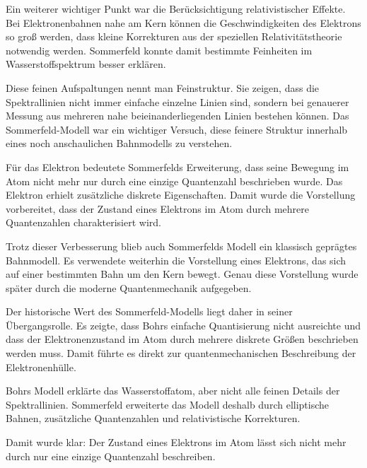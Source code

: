 Ein weiterer wichtiger Punkt war die Berücksichtigung relativistischer Effekte.
Bei Elektronenbahnen nahe am Kern können die Geschwindigkeiten des Elektrons so
groß werden, dass kleine Korrekturen aus der speziellen Relativitätstheorie
notwendig werden. Sommerfeld konnte damit bestimmte Feinheiten im
Wasserstoffspektrum besser erklären.

Diese feinen Aufspaltungen nennt man Feinstruktur. Sie zeigen, dass die
Spektrallinien nicht immer einfache einzelne Linien sind, sondern bei genauerer
Messung aus mehreren nahe beieinanderliegenden Linien bestehen können. Das
Sommerfeld-Modell war ein wichtiger Versuch, diese feinere Struktur innerhalb
eines noch anschaulichen Bahnmodells zu verstehen.

Für das Elektron bedeutete Sommerfelds Erweiterung, dass seine Bewegung im Atom
nicht mehr nur durch eine einzige Quantenzahl beschrieben wurde. Das Elektron
erhielt zusätzliche diskrete Eigenschaften. Damit wurde die Vorstellung
vorbereitet, dass der Zustand eines Elektrons im Atom durch mehrere Quantenzahlen
charakterisiert wird.

Trotz dieser Verbesserung blieb auch Sommerfelds Modell ein klassisch
geprägtes Bahnmodell. Es verwendete weiterhin die Vorstellung eines Elektrons,
das sich auf einer bestimmten Bahn um den Kern bewegt. Genau diese Vorstellung
wurde später durch die moderne Quantenmechanik aufgegeben.

Der historische Wert des Sommerfeld-Modells liegt daher in seiner
Übergangsrolle. Es zeigte, dass Bohrs einfache Quantisierung nicht ausreichte
und dass der Elektronenzustand im Atom durch mehrere diskrete Größen beschrieben
werden muss. Damit führte es direkt zur quantenmechanischen Beschreibung der
Elektronenhülle.

\begin{DidacticBox}
	
	\label{box:sommerfeld-erweiterung}
	Bohrs Modell erklärte das Wasserstoffatom, aber nicht alle feinen Details der
	Spektrallinien. Sommerfeld erweiterte das Modell deshalb durch elliptische
	Bahnen, zusätzliche Quantenzahlen und relativistische Korrekturen.
	
	Damit wurde klar: Der Zustand eines Elektrons im Atom lässt sich nicht mehr
	durch nur eine einzige Quantenzahl beschreiben.
	
\end{DidacticBox}